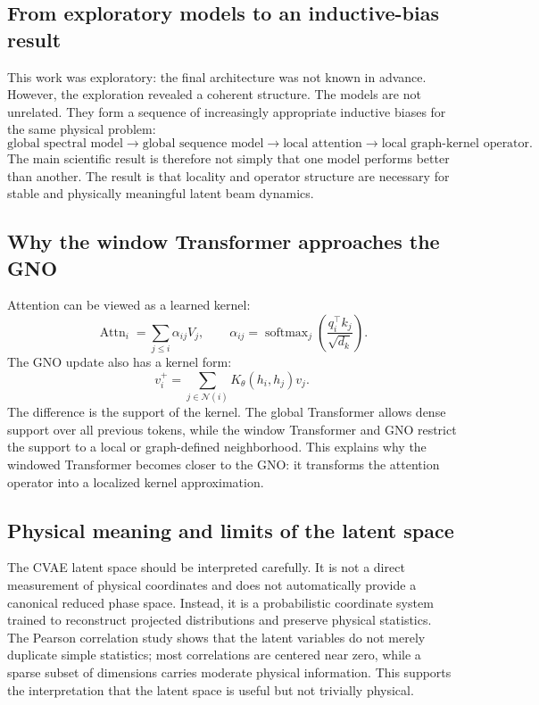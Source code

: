 \documentclass[11pt,a4paper]{article}
\begin{document}
\begin{sloppypar}
\subsection{From exploratory models to an inductive-bias result}
This work was exploratory: the final architecture was not known in advance. However, the exploration revealed a coherent structure. The models are not unrelated. They form a sequence of increasingly appropriate inductive biases for the same physical problem:
\begin{equation}
    \text{global spectral model}
    \rightarrow
    \text{global sequence model}
    \rightarrow
    \text{local attention}
    \rightarrow
    \text{local graph-kernel operator}.
\end{equation}
The main scientific result is therefore not simply that one model performs better than another. The result is that locality and operator structure are necessary for stable and physically meaningful latent beam dynamics.

\subsection{Why the window Transformer approaches the GNO}
Attention can be viewed as a learned kernel:
\begin{equation}
    \operatorname{Attn}_i
    =
    \sum_{j\le i}\alpha_{ij}V_j,
    \qquad
    \alpha_{ij}
    =
    \operatorname{softmax}_j
    \left(
    \frac{q_i^\top k_j}{\sqrt{d_k}}
    \right).
\end{equation}
The GNO update also has a kernel form:
\begin{equation}
    v_i^{+}
    =
    \sum_{j\in\mathcal{N}(i)}
    K_{\theta}(h_i,h_j)v_j.
\end{equation}
The difference is the support of the kernel. The global Transformer allows dense support over all previous tokens, while the window Transformer and GNO restrict the support to a local or graph-defined neighborhood. This explains why the windowed Transformer becomes closer to the GNO: it transforms the attention operator into a localized kernel approximation.

\subsection{Physical meaning and limits of the latent space}
The CVAE latent space should be interpreted carefully. It is not a direct measurement of physical coordinates and does not automatically provide a canonical reduced phase space. Instead, it is a probabilistic coordinate system trained to reconstruct projected distributions and preserve physical statistics. The Pearson correlation study shows that the latent variables do not merely duplicate simple statistics; most correlations are centered near zero, while a sparse subset of dimensions carries moderate physical information. This supports the interpretation that the latent space is useful but not trivially physical.


\end{sloppypar}
\end{document}
